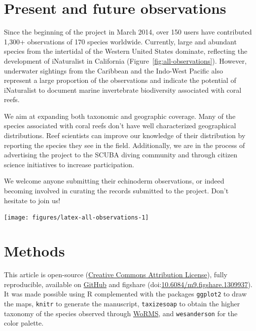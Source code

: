 \documentclass[11pt]{article}\usepackage[]{graphicx}\usepackage[]{color}
\newenvironment{knitrout}{}{} %
\begin{document}
\section*{Present and future observations}

Since the beginning of the project in March 2014, over 150 users have
contributed 1,300+ observations of 170 species worldwide. Currently, large and
abundant species from the intertidal of the Western United States dominate,
reflecting the development of iNaturalist in California
(Figure~\ref{fig:all-observations}). However, underwater sightings from the
Caribbean and the Indo-West Pacific also represent a large proportion of the
observations and indicate the potential of iNaturalist to document marine
invertebrate biodiversity associated with coral reefs.

We aim at expanding both taxonomic and geographic coverage. Many of the species
associated with coral reefs don't have well characterized geographical
distributions. Reef scientists can improve our knowledge of their distribution
by reporting the species they see in the field. Additionally, we are in the
process of advertising the project to the SCUBA diving community and through
citizen science initiatives to increase participation.

We welcome anyone submitting their echinoderm observations, or indeed becoming
involved in curating the records submitted to the project. Don't hesitate to
join us!

\begin{center}
\begin{knitrout}
\color{fgcolor}
\texttt{[image: figures/latex-all-observations-1]} 

\end{knitrout}
\label{fig:all-observations}
\end{center}

\section*{Methods}

{\small This article is open-source
  (\href{http://creativecommons.org/licenses/by/4.0/}{Creative Commons
    Attribution License}), fully reproducible, available on
  \href{https://github.com/fmichonneau/inat-paper/}{GitHub} and figshare
  (doi:\href{http://dx.doi.org/10.6084/m9.figshare.1309937}{10.6084/m9.figshare.1309937}). It
  was made possible using R \citep{Rproject} complemented with the packages
  \texttt{ggplot2} \citep{Wickham2009} to draw the maps, \texttt{knitr}
  \citep{Xie2014} to generate the manuscript, \texttt{taxizesoap}
  \citep{Chamberlain2013,Chamberlain2014} to obtain the higher taxonomy of the
  species observed through \href{http://marinespecies.org/}{WoRMS}, and
  \texttt{wesanderson} \citep{Ram2014} for the color palette.  }




\end{document}
